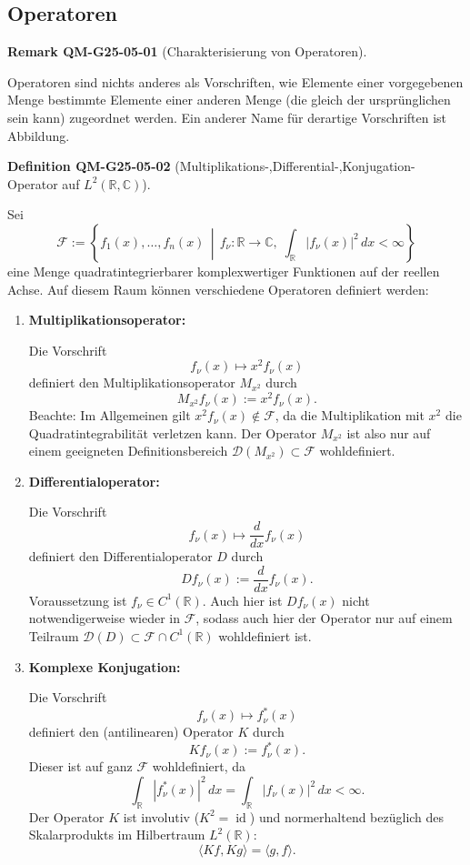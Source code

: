 \documentclass[10pt, letterpaper]{article}
\newcommand{\R}{\mathbb{R}}
\newcommand{\C}{\mathbb{C}}
\newcommand{\CustomHeading}[3]{%
  \par\medskip\noindent%
  \textbf{#1 #2} \textnormal{(#3)}.\enskip%
}
\newenvironment{DEF}[2]{\CustomHeading{Definition}{#1}{#2}}{}
\newenvironment{REM}[2]{\CustomHeading{Remark}{#1}{#2}}{}
\begin{document}
\subsection{Operatoren}

\begin{REM}{QM-G25-05-01}{Charakterisierung von Operatoren}
Operatoren sind nichts anderes als Vorschriften, wie Elemente einer vorgegebenen Menge bestimmte Elemente einer anderen Menge (die gleich der ursprünglichen sein kann) zugeordnet werden. Ein anderer Name für derartige Vorschriften ist Abbildung.
\end{REM}

\begin{DEF}{QM-G25-05-02}{Multiplikations-,Differential-,Konjugation-Operator auf $L^2(\R,\C)$}
Sei
\[
\mathcal{F} := \left\{ f_1(x), \dotsc, f_n(x) \,\middle|\, f_\nu : \mathbb{R} \to \mathbb{C}, \; \int_{\mathbb{R}} |f_\nu(x)|^2 \, dx < \infty \right\}
\]
eine Menge quadratintegrierbarer komplexwertiger Funktionen auf der reellen Achse. Auf diesem Raum können verschiedene Operatoren definiert werden:

\begin{enumerate}
  \item \textbf{Multiplikationsoperator:}

  Die Vorschrift
  \[
  f_\nu(x) \mapsto x^2 f_\nu(x)
  \]
  definiert den Multiplikationsoperator $M_{x^2}$ durch
  \[
  M_{x^2} f_\nu(x) := x^2 f_\nu(x).
  \]
  Beachte: Im Allgemeinen gilt $x^2 f_\nu(x) \notin \mathcal{F}$, da die Multiplikation mit $x^2$ die Quadratintegrabilität verletzen kann. Der Operator $M_{x^2}$ ist also nur auf einem geeigneten Definitionsbereich $\mathcal{D}(M_{x^2}) \subset \mathcal{F}$ wohldefiniert.

  \item \textbf{Differentialoperator:}

  Die Vorschrift
  \[
  f_\nu(x) \mapsto \frac{d}{dx} f_\nu(x)
  \]
  definiert den Differentialoperator $D$ durch
  \[
  D f_\nu(x) := \frac{d}{dx} f_\nu(x).
  \]
  Voraussetzung ist $f_\nu \in C^1(\mathbb{R})$. Auch hier ist $D f_\nu(x)$ nicht notwendigerweise wieder in $\mathcal{F}$, sodass auch hier der Operator nur auf einem Teilraum $\mathcal{D}(D) \subset \mathcal{F} \cap C^1(\mathbb{R})$ wohldefiniert ist.

  \item \textbf{Komplexe Konjugation:}

  Die Vorschrift
  \[
  f_\nu(x) \mapsto f_\nu^*(x)
  \]
  definiert den (antilinearen) Operator $K$ durch
  \[
  K f_\nu(x) := f_\nu^*(x).
  \]
  Dieser ist auf ganz $\mathcal{F}$ wohldefiniert, da
  \[
  \int_{\mathbb{R}} |f_\nu^*(x)|^2 \, dx = \int_{\mathbb{R}} |f_\nu(x)|^2 \, dx < \infty.
  \]
  Der Operator $K$ ist involutiv ($K^2 = \operatorname{id}$) und normerhaltend bezüglich des Skalarprodukts im Hilbertraum $L^2(\mathbb{R})$:
  \[
  \langle Kf, Kg \rangle = \langle g, f \rangle.
  \]
  
\end{enumerate}
\end{DEF}
\end{document}
